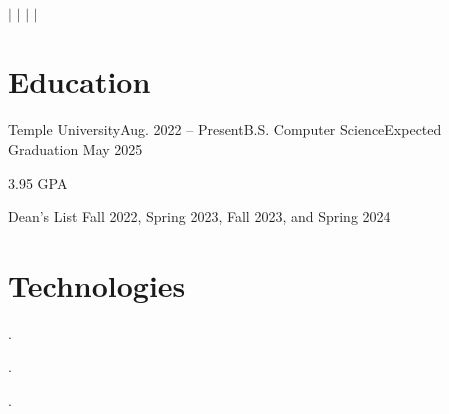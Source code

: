 \documentclass[letterpaper,11pt]{article}
\begin{document}
{\Huge \myname}
\\
\vspace{2pt}

\small{
    \faEnvelope
    \thinspace \thinspace
    \myemail
    \thinspace \thinspace $|$
    \faGithub
    \thinspace \thinspace
    \mygh
    \thinspace \thinspace $|$
    \faLinkedin
    \thinspace \thinspace
    \mylinkedin
    \thinspace \thinspace $|$
    \faPhone
    \thinspace \thinspace
    \myphone
    \thinspace \thinspace $|$
    \thinspace \thinspace
    \mylocation
}

\vspace{-7pt}

\section{Education}
\begin{entries}
    \item\begin{experience}{Temple University}{Aug. 2022 -- Present}{B.S. Computer Science}{Expected Graduation May 2025}
        \item 3.95 GPA
        \item Dean's List Fall 2022, Spring 2023, Fall 2023, and Spring 2024
    \end{experience}
\end{entries}

\section{Technologies}
\begin{description}[nosep, labelindent=0.15in]
    \item[Programming Languages:] \myprogramminglanguages.
    \item[Libraries:] \mylibraries.
    \item[Tools:] \mytools.
\end{description}
\end{document}
